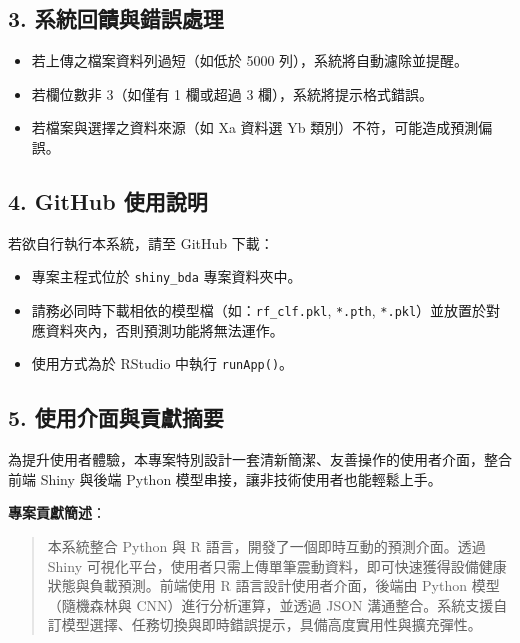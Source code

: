 \documentclass[a4paper,12pt]{article}
\begin{document}
\subsection*{3. 系統回饋與錯誤處理}

\begin{itemize}
  \item 若上傳之檔案資料列過短（如低於 5000 列），系統將自動濾除並提醒。
  \item 若欄位數非 3（如僅有 1 欄或超過 3 欄），系統將提示格式錯誤。
  \item 若檔案與選擇之資料來源（如 Xa 資料選 Yb 類別）不符，可能造成預測偏誤。
\end{itemize}

\subsection*{4. GitHub 使用說明}

若欲自行執行本系統，請至 GitHub 下載：

\begin{itemize}
  \item 專案主程式位於 \texttt{shiny\_bda} 專案資料夾中。
  \item 請務必同時下載相依的模型檔（如：\texttt{rf\_clf.pkl}, \texttt{*.pth}, \texttt{*.pkl}）並放置於對應資料夾內，否則預測功能將無法運作。
  \item 使用方式為於 RStudio 中執行 \texttt{runApp()}。
\end{itemize}

\subsection*{5. 使用介面與貢獻摘要}

為提升使用者體驗，本專案特別設計一套清新簡潔、友善操作的使用者介面，整合前端 Shiny 與後端 Python 模型串接，讓非技術使用者也能輕鬆上手。

\textbf{專案貢獻簡述}：

\begin{quote}
本系統整合 Python 與 R 語言，開發了一個即時互動的預測介面。透過 Shiny 可視化平台，使用者只需上傳單筆震動資料，即可快速獲得設備健康狀態與負載預測。前端使用 R 語言設計使用者介面，後端由 Python 模型（隨機森林與 CNN）進行分析運算，並透過 JSON 溝通整合。系統支援自訂模型選擇、任務切換與即時錯誤提示，具備高度實用性與擴充彈性。
\end{quote}
\end{document}
